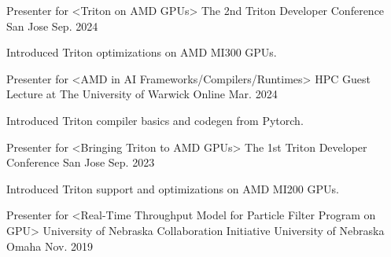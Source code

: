 

\begin{cventries}

  \cventry
    {Presenter for <Triton on AMD GPUs>} %
    {The 2nd Triton Developer Conference} %
    {San Jose} %
    {Sep. 2024} %
    {
      \begin{cvitems} %
        \item {Introduced Triton optimizations on AMD MI300 GPUs.}
      \end{cvitems}
    }
  
  \cventry
    {Presenter for <AMD in AI Frameworks/Compilers/Runtimes>} %
    {HPC Guest Lecture at The University of Warwick} %
    {Online} %
    {Mar. 2024} %
    {
      \begin{cvitems} %
        \item {Introduced Triton compiler basics and codegen from Pytorch.}
      \end{cvitems}
    }

  \cventry
    {Presenter for <Bringing Triton to AMD GPUs>} %
    {The 1st Triton Developer Conference} %
    {San Jose} %
    {Sep. 2023} %
    {
      \begin{cvitems} %
        \item {Introduced Triton support and optimizations on AMD MI200 GPUs.}
      \end{cvitems}
    }

  \cventry
    {Presenter for <Real-Time Throughput Model for Particle Filter Program on GPU>} %
    {University of Nebraska Collaboration Initiative} %
    {University of Nebraska Omaha} %
    {Nov. 2019} %
    {
    }


\end{cventries}
